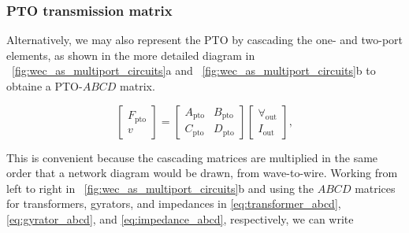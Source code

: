 \documentclass[lettersize,journal]{IEEEtran}
\begin{document}
\subsubsection{PTO transmission matrix}\label{sec:pto_transmission_matrix}
Alternatively, we may also represent the PTO by cascading the one- and two-port elements, as shown in the more detailed diagram in \figurename~\ref{fig:wec_as_multiport_circuits}a and \figurename~\ref{fig:wec_as_multiport_circuits}b to obtaine a PTO-$ABCD$ matrix.

\begin{equation}
	\label{eq:pto_ABCD_mat_def}
	\begin{bmatrix} 
		F_{\textrm{pto}} \\
		v 
	\end{bmatrix} 
	= 
        \begin{bmatrix} 
	A_{\textrm{pto}} & B_{\textrm{pto}} \\ 
	C_{\textrm{pto}} & D_{\textrm{pto}} 
        \end{bmatrix}
	\begin{bmatrix} 
		\forall_{\textrm{out}} \\
		I_{\textrm{out}} 
	\end{bmatrix},
\end{equation}

\noindent{}This is convenient because the cascading matrices are multiplied in the same order that a network diagram would be drawn, from wave-to-wire.
Working from left to right in \figurename~\ref{fig:wec_as_multiport_circuits}b and using the $ABCD$ matrices for transformers, gyrators, and impedances in \eqref{eq:transformer_abcd}, \eqref{eq:gyrator_abcd}, and \eqref{eq:impedance_abcd}, respectively, we can write 
\end{document}

